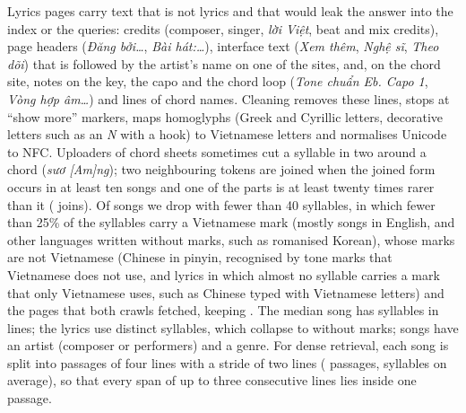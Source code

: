 \documentclass[11pt]{article}
\newcommand{\vi}[1]{\textit{#1}}          %
\begin{document}
Lyrics pages carry text that is not lyrics and that would leak the answer into the index or the queries:
credits (composer, singer, \vi{lời Việt}, beat and mix credits), page headers (\vi{Đăng bởi\dots},
\vi{Bài hát:\dots}), interface text (\vi{Xem thêm}, \vi{Nghệ sĩ}, \vi{Theo dõi}) that is followed by the
artist's name on one of the sites, and, on the chord site, notes on the key, the capo and the chord loop
(\vi{Tone chuẩn Eb. Capo 1}, \vi{Vòng hợp âm\dots}) and lines of chord names. Cleaning removes these
lines, stops at ``show more'' markers, maps homoglyphs (Greek and Cyrillic letters, decorative letters such
as an \vi{N} with a hook) to Vietnamese letters and normalises Unicode to NFC. Uploaders of chord sheets
sometimes cut a syllable in two around a chord (\vi{sươ [Am]ng}); two neighbouring tokens are joined when
the joined form occurs in at least ten songs and one of the parts is at least twenty times rarer than it
(\NSplitJoins{} joins). Of \NSongsIn{} songs we drop \NTooShort{} with fewer than 40 syllables, \NNotVi{} in
which fewer than 25\% of the syllables carry a Vietnamese mark (mostly songs in English, and other
languages written without marks, such as romanised Korean), \NRomanised{} whose marks are not Vietnamese
(Chinese in pinyin, recognised by tone marks that Vietnamese does not use, and lyrics in which almost no
syllable carries a mark that only Vietnamese uses, such as Chinese typed with Vietnamese letters) and
the \NDupId{} pages that both crawls fetched, keeping \NSongs. The median song has \MedianSyl{} syllables in \MedianLines{} lines;
the lyrics use \NMarkedTypes{} distinct syllables, which collapse to \NUnmarkedTypes{} without marks;
\NWithArtist{} songs have an artist (composer or performers) and \NWithGenre{} a genre. For dense
retrieval, each song is split into passages of four lines with a stride of two lines (\NPassages{}
passages, \MeanPassageSyl{} syllables on average), so that every span of up to three consecutive lines
lies inside one passage.
\end{document}
